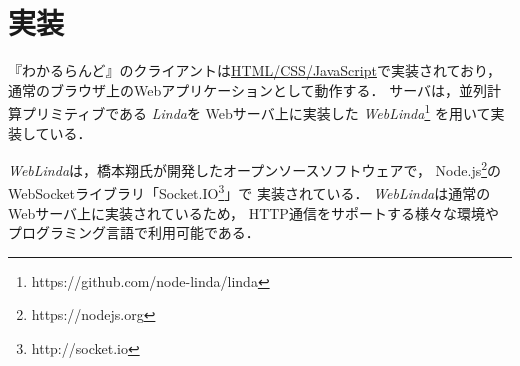\section{実装}

『わかるらんど』のクライアントは\url{HTML/CSS/JavaScript}で実装されており，
通常のブラウザ上のWebアプリケーションとして動作する．
サーバは，並列計算プリミティブである
\textit{Linda}\cite{Carriero:1989:LC:63334.63337}を
Webサーバ上に実装した
\textit{WebLinda}\cite{shokai_furnitue}\footnote{https://github.com/node-linda/linda}
を用いて実装している．

\textit{WebLinda}は，橋本翔氏が開発したオープンソースソフトウェアで，
Node.js\footnote{https://nodejs.org}の
WebSocketライブラリ「Socket.IO\footnote{http://socket.io}」で
実装されている．
\textit{WebLinda}は通常のWebサーバ上に実装されているため，
HTTP通信をサポートする様々な環境やプログラミング言語で利用可能である．